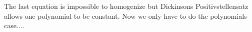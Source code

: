 \documentclass[./main.tex]{subfiles}
\begin{document}
The last equation is impossible to homogenize but Dickinsons Positivstellensatz allows one polynomial to be constant. Now we only have to do the polynomials case....


\end{document}
